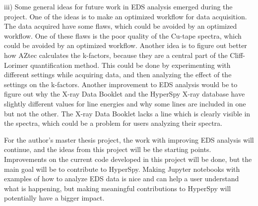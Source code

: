 iii) Some general ideas for future work in EDS analysis emerged during the project.
One of the ideas is to make an optimized workflow for data acquisition.
The data acquired have some flaws, which could be avoided by an optimized workflow.
One of these flaws is the poor quality of the Cu-tape spectra, which could be avoided by an optimized workflow.
Another idea is to figure out better how AZtec calculates the k-factors, because they are a central part of the Cliff-Lorimer quantification method.
This could be done by experimenting with different settings while acquiring data, and then analyzing the effect of the settings on the k-factors.
Another improvement to EDS analysis would be to figure out why the X-ray Data Booklet and the HyperSpy X-ray database have slightly different values for line energies and why some lines are included in one but not the other.
The X-ray Data Booklet lacks a line which is clearly visible in the spectra, which could be a problem for users analyzing their spectra.







For the author's master thesis project, the work with improving EDS analysis will continue, and the ideas from this project will be the starting points.
Improvements on the current code developed in this project will be done, but the main goal will be to contribute to HyperSpy.
Making Jupyter notebooks with examples of how to analyze EDS data is nice and can help a user understand what is happening, but making meaningful contributions to HyperSpy will potentially have a bigger impact.





